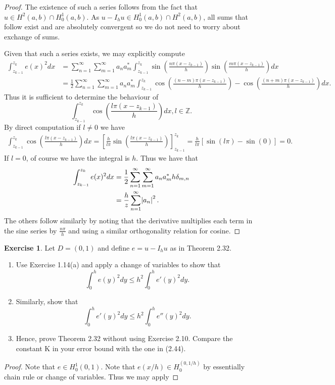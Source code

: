 \documentclass{amsart}
\theoremstyle{plain}
\theoremstyle{definition}
\newtheorem{exer}{Exercise}[section]
\newcommand{\Z}{\mathbb{Z}}
\begin{document}
\begin{proof}
    The existence of such a series follows from the fact that $u\in H^2(a,b) \cap H_0^1(a,b)$. As $u-I_h u \in H_0^1(a,b)\cap H^2(a,b)$, all sums that follow exist and are absolutely convergent so we do not need to worry about exchange of sums. 
    \par Given that such a series exists, we may explicitly compute 
    \begin{align*}
        \int_{z_{k-1}}^{z_k} e(x)^2 dx &= \sum_{n=1}^\infty \sum_{m=1}^\infty a_n a_m^* \int_{z_{k-1}}^{z_k} \sin\left(\frac{n\pi (x-z_{k-1})}{h}\right)\sin\left(\frac{m\pi (x-z_{k-1})}{h}\right) dx\\
        &=  \frac{1}{2}\sum_{n=1}^\infty \sum_{m=1}^\infty a_n a_m^* \int_{z_{k-1}}^{z_k} \cos\left(\frac{(n-m)\pi (x-z_{k-1})}{h}\right) - \cos\left(\frac{(n+m)\pi (x-z_{k-1})}{h}\right) dx.
    \end{align*}
    Thus it is sufficient to determine the behaviour of $$\int_{z_{k-1}}^{z_k} \cos\left(\frac{l\pi (x-z_{k-1})}{h}\right) dx, l\in \Z. $$ By direct computation if $l\neq 0$ we have
    \begin{align*}
        \int_{z_{k-1}}^{z_k} \cos\left(\frac{l\pi (x-z_{k-1})}{h}\right) dx = \left[\frac{h}{l\pi} \sin\left(\frac{l\pi (x-z_{k-1})}{h}\right)\right]_{z_{k-1}}^{z_k} = \frac{h}{l\pi} \left[\sin(l\pi) - \sin(0)\right] = 0. 
    \end{align*}
    If $l= 0$, of course we have the integral is $h$. Thus we have that 
     \begin{align*}
        \int_{z_{k-1}}^{z_k} e(x)^2 dx  &=  \frac{1}{2}\sum_{n=1}^\infty \sum_{m=1}^\infty a_n a_m^* h \delta_{m,n} \\
        &= \frac{h}{z}\sum_{n=1}^{\infty} \abs{a_n}^2.
    \end{align*}
    The others follow similarly by noting that the derivative multiplies each term in the sine series by $\frac{n\pi}{h}$ and using a similar orthogonality relation for cosine. 
\end{proof}

\begin{exer}
     Let $D = (0, 1)$ and define $e = u - I_h u$ as in Theorem 2.32.
    \begin{enumerate}[label=\alph*.]
        \item Use Exercise 1.14(a) and apply a change of variables to show that 
        $$\int_0^h e(y)^2 dy \leq h^2 \int_0^h  e'(y)^2 dy.$$
        \item Similarly, show that 
        $$\int_0^h e'(y)^2 dy \leq h^2 \int_0^h e''(y)^2 dy.$$
        \item  Hence, prove Theorem 2.32 without using Exercise 2.10. Compare the constant K in your error bound with the one in (2.44).
    \end{enumerate}
\end{exer}
\begin{proof}
    Note that $e\in H_0^1(0,1)$. Note that $e(x/h) \in H_0^(0,1/h)$ by essentially chain rule or change of variables. Thus we may apply 
\end{proof}

\printbibliography
\end{document}
